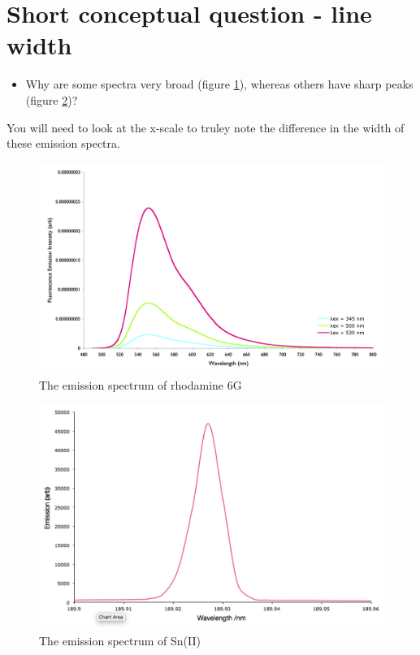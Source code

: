 \documentclass[
]{book}
\providecommand{\tightlist}{%
  \setlength{\itemsep}{0pt}\setlength{\parskip}{0pt}}
\begin{document}
\hypertarget{sec:linewidth}{%
\section{Short conceptual question - line width}\label{sec:linewidth}}

\begin{itemize}
\tightlist
\item
  Why are some spectra very broad (figure \ref{fig:molecular}), whereas others have sharp peaks (figure \ref{fig:atomic})?
\end{itemize}

You will need to look at the x-scale to truley note the difference in the width of these emission spectra.

\begin{figure}

{\centering \includegraphics[width=0.7\linewidth]{images/rhodamine6G} 

}

\caption{The emission spectrum of rhodamine 6G}\label{fig:molecular}
\end{figure}

\begin{figure}

{\centering \includegraphics[width=0.7\linewidth]{images/atomic_emission_spectrum} 

}

\caption{The emission spectrum of Sn(II)}\label{fig:atomic}
\end{figure}
\end{document}
